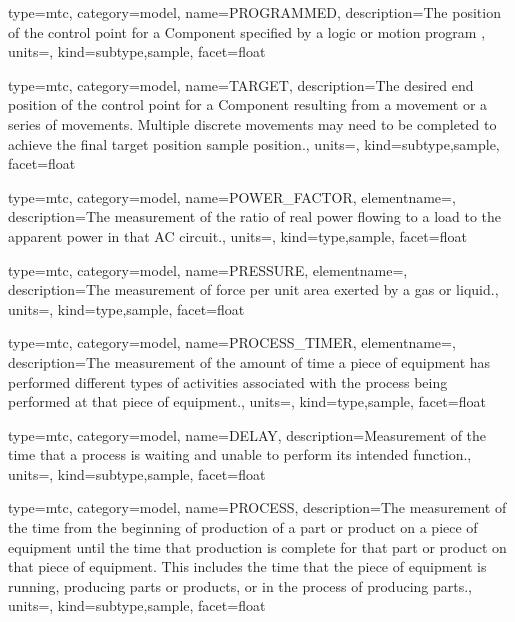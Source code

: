 {
  type=mtc,
  category=model,
  name={PROGRAMMED},
  description={The position of the control point for a Component specified by a logic or motion program },
  units=,
  kind={subtype,sample},
  facet={\gls{float}}
}


{
  type=mtc,
  category=model,
  name={TARGET},
  description={The desired end position of the control point for a Component resulting from a movement or a series of movements.  Multiple discrete movements may need to be completed to achieve the final \gls{target position sample} position.},
  units=,
  kind={subtype,sample},
  facet={\gls{float}}
}


{
  type=mtc,
  category=model,
  name={POWER\_FACTOR},
  elementname=,
  description={The measurement of the ratio of real power flowing to a load to the apparent power in that AC circuit.},
  units=,
  kind={type,sample},
  facet={\gls{float}}
}


{
  type=mtc,
  category=model,
  name={PRESSURE},
  elementname=,
  description={The measurement of force per unit area exerted by a gas or liquid.},
  units=,
  kind={type,sample},
  facet={\gls{float}}
}


{
  type=mtc,
  category=model,
  name={PROCESS\_TIMER},
  elementname=,
  description={The measurement of the amount of time a piece of equipment has performed different types of activities associated with the process being performed at that piece of equipment.},
  units=,
  kind={type,sample},
  facet={\gls{float}}
}


{
  type=mtc,
  category=model,
  name={DELAY},
  description={Measurement of the time that a process is waiting and unable to perform its intended function.},
  units=,
  kind={subtype,sample},
  facet={\gls{float}}
}


{
  type=mtc,
  category=model,
  name={PROCESS},
  description={The measurement of the time from the beginning of production of a part or product on a piece of equipment until the time that production is complete for that part or product on that piece of equipment.  This includes the time that the piece of equipment is running, producing parts or products, or in the process of producing parts.},
  units=,
  kind={subtype,sample},
  facet={\gls{float}}
}


